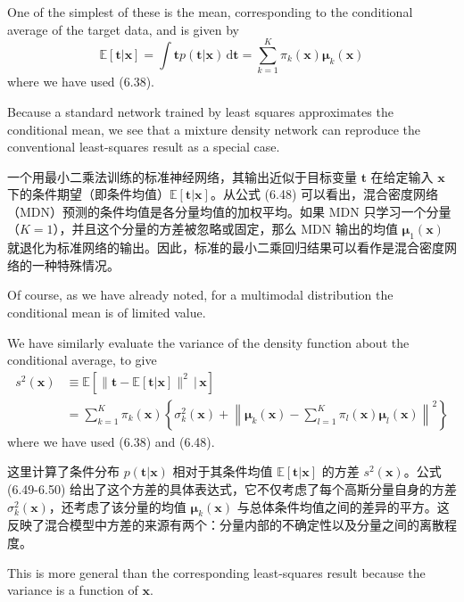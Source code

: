 \documentclass{article}
\begin{document}
One of the simplest of these is the mean, corresponding to the conditional average of the target data, and is given by
\begin{equation}
\mathbb{E}\left[\mathbf{t}|\mathbf{x}\right] = \int \mathbf{t} p(\mathbf{t}|\mathbf{x}) \,\mathrm{d}\mathbf{t} 
= \sum_{k=1}^{K} \pi_k(\mathbf{x}) \boldsymbol{\mu}_k(\mathbf{x})
\tag{6.48}
\end{equation}
where we have used (6.38). 

Because a standard network trained by least squares approximates the conditional mean, we see that a mixture density network can reproduce the conventional least-squares result as a special case. 

{\color{red}
一个用最小二乘法训练的标准神经网络，其输出近似于目标变量 $\mathbf{t}$ 在给定输入 $\mathbf{x}$ 下的条件期望（即条件均值）$\mathbb{E}[\mathbf{t}|\mathbf{x}]$。从公式 (6.48) 可以看出，混合密度网络（MDN）预测的条件均值是各分量均值的加权平均。如果 MDN 只学习一个分量（$K=1$），并且这个分量的方差被忽略或固定，那么 MDN 输出的均值 $\boldsymbol{\mu}_1(\mathbf{x})$ 就退化为标准网络的输出。因此，标准的最小二乘回归结果可以看作是混合密度网络的一种特殊情况。
}

Of course, as we have already noted, for a multimodal distribution the conditional mean is of limited value.

We have similarly evaluate the variance of the density function about the conditional average, to give
\begin{align}
s^2(\mathbf{x}) &\equiv \mathbb{E}\left[ \|\mathbf{t} - \mathbb{E}[\mathbf{t}|\mathbf{x}]\|^2 \,\big|\, \mathbf{x} \right] \\
&= \sum_{k=1}^{K} \pi_k(\mathbf{x}) \left\{ \sigma_k^2(\mathbf{x}) + \left\| \boldsymbol{\mu}_k(\mathbf{x}) - \sum_{l=1}^{K} \pi_l(\mathbf{x}) \boldsymbol{\mu}_l(\mathbf{x}) \right\|^2 \right\}
\tag{6.49--6.50}
\end{align}
where we have used (6.38) and (6.48). 

{\color{red}
这里计算了条件分布 $p(\mathbf{t}|\mathbf{x})$ 相对于其条件均值 $\mathbb{E}[\mathbf{t}|\mathbf{x}]$ 的方差 $s^2(\mathbf{x})$。公式 (6.49-6.50) 给出了这个方差的具体表达式，它不仅考虑了每个高斯分量自身的方差 $\sigma_k^2(\mathbf{x})$，还考虑了该分量的均值 $\boldsymbol{\mu}_k(\mathbf{x})$ 与总体条件均值之间的差异的平方。这反映了混合模型中方差的来源有两个：分量内部的不确定性以及分量之间的离散程度。
}

This is more general than the corresponding least-squares result because the variance is a function of $\mathbf{x}$.
\end{document}
